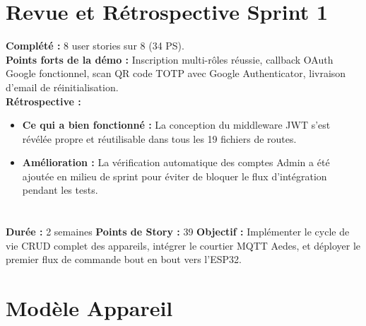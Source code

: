 \section{Revue et Rétrospective Sprint 1}

\begin{tcolorbox}[goalbox,title={Revue Sprint 1}]
\textbf{Complété :} 8 user stories sur 8 (34 PS). \\
\textbf{Points forts de la démo :} Inscription multi-rôles réussie, callback OAuth Google
fonctionnel, scan QR code TOTP avec Google Authenticator, livraison d'email de
réinitialisation. \\
\textbf{Rétrospective :}
\begin{itemize}[leftmargin=1cm,itemsep=2pt]
  \item \textbf{Ce qui a bien fonctionné :} La conception du middleware JWT s'est révélée
        propre et réutilisable dans tous les 19 fichiers de routes.
  \item \textbf{Amélioration :} La vérification automatique des comptes Admin a été ajoutée
        en milieu de sprint pour éviter de bloquer le flux d'intégration pendant les tests.
\end{itemize}
\end{tcolorbox}

\section*{}
\begin{tcolorbox}[sprintbox,title={Sprint 2 --- Gestion des Appareils et Intégration MQTT}]
\textbf{Durée :} 2 semaines \quad
\textbf{Points de Story :} 39 \quad
\textbf{Objectif :} Implémenter le cycle de vie CRUD complet des appareils, intégrer le
courtier MQTT Aedes, et déployer le premier flux de commande bout en bout vers l'ESP32.
\end{tcolorbox}

\section{Modèle Appareil}

